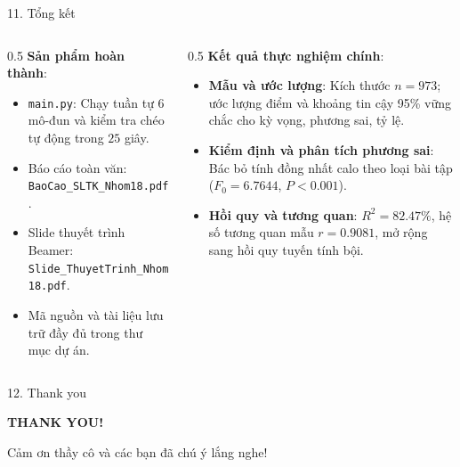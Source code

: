 \documentclass[aspectratio=169, 10pt]{beamer}
\begin{document}
\begin{frame}{11. Tổng kết}
    \begin{columns}
        \begin{column}{0.5\textwidth}
            \textbf{Sản phẩm hoàn thành}:
            \begin{itemize}
                \item \texttt{main.py}: Chạy tuần tự 6 mô-đun và kiểm tra chéo tự động trong $25$ giây.
                \item Báo cáo toàn văn: \texttt{BaoCao\_SLTK\_Nhom18.pdf}.
                \item Slide thuyết trình Beamer: \texttt{Slide\_ThuyetTrinh\_Nhom18.pdf}.
                \item Mã nguồn và tài liệu lưu trữ đầy đủ trong thư mục dự án.
            \end{itemize}
        \end{column}
        \begin{column}{0.5\textwidth}
            \textbf{Kết quả thực nghiệm chính}:
            \begin{itemize}
                \item \textbf{Mẫu và ước lượng}: Kích thước $n=973$; ước lượng điểm và khoảng tin cậy 95\% vững chắc cho kỳ vọng, phương sai, tỷ lệ.
                \item \textbf{Kiểm định và phân tích phương sai}: Bác bỏ tính đồng nhất calo theo loại bài tập ($F_0 = 6.7644$, $P < 0.001$).
                \item \textbf{Hồi quy và tương quan}: $R^2 = 82.47\%$, hệ số tương quan mẫu $r = 0.9081$, mở rộng sang hồi quy tuyến tính bội.
            \end{itemize}
        \end{column}
    \end{columns}
\end{frame}

\begin{frame}[c]{12. Thank you}
    \begin{center}
        \vspace{1.5cm}
        {\Huge\bfseries\color{NavyBlue} THANK YOU!}
        
        \vspace{1cm}
        {\large Cảm ơn thầy cô và các bạn đã chú ý lắng nghe!}
    \end{center}
\end{frame}
\end{document}
